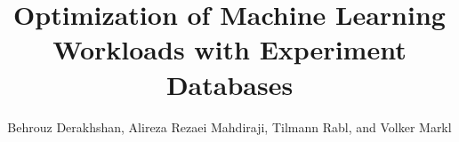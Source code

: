 \documentclass{vldb}
\begin{document}

\title{Optimization of Machine Learning Workloads with Experiment Databases}

%
%
%
%
%
\author{
{\large Behrouz Derakhshan, Alireza Rezaei Mahdiraji, Tilmann Rabl, and Volker Markl}\\
\affaddr{}\\
\\
}


\maketitle













\end{document}
